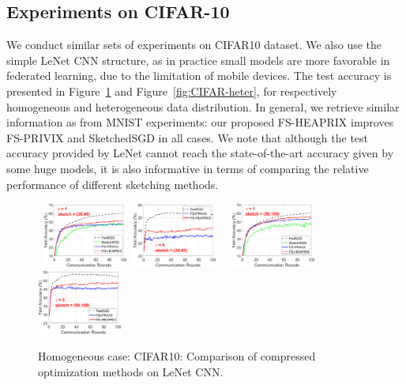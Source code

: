 \documentclass[sigconf, anonymous, review]{acmart}
\begin{document}
\subsection{Experiments on CIFAR-10}


We conduct similar sets of experiments on CIFAR10 dataset. We also use the simple LeNet CNN structure, as in practice small models are more favorable in federated learning, due to the limitation of mobile devices. The test accuracy is presented in Figure~\ref{fig:CIFAR-homog} and Figure~\ref{fig:CIFAR-heter}, for respectively homogeneous and heterogeneous data distribution. In general, we retrieve similar information as from MNIST experiments: our proposed FS-HEAPRIX improves FS-PRIVIX and SketchedSGD in all cases. We note that although the test accuracy provided by LeNet cannot reach the state-of-the-art accuracy given by some huge models, it is also informative in terms of comparing the relative performance of different sketching methods.



\begin{figure}[h]
	\begin{center}
		\mbox{%
		\includegraphics[width=0.25\textwidth]{CIFAR_figures/cifar_local1_sketch20_iid1_test_acc.eps}  
		 \includegraphics[width=0.25\textwidth]{CIFAR_figures/cifar_local5_sketch20_iid1_test_acc.eps}
		}
		\mbox{%
	\includegraphics[width=0.25\textwidth]{CIFAR_figures/cifar_local1_sketch50_iid1_test_acc.eps} 
		\includegraphics[width=0.25\textwidth]{CIFAR_figures/cifar_local5_sketch50_iid1_test_acc.eps}
		}
	\end{center}
	\caption{Homogeneous case: CIFAR10: Comparison of compressed optimization methods on LeNet CNN.}
    \label{fig:CIFAR-homog}
\end{figure}
\end{document}
